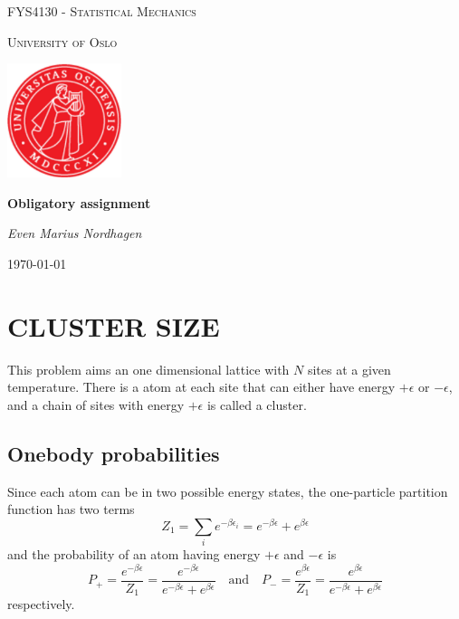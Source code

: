 \documentclass[norsk,a4paper,12pt]{article}
\begin{document}
\begin{titlepage}
	\centering
	{\scshape\huge FYS4130 - Statistical Mechanics \par}
	\vspace{1cm}
	{\scshape\Large University of Oslo\par}
	\vspace{1.5cm}
	\includegraphics[width=0.25\textwidth]{uio.png}\par\vspace{1cm}
	{\Large\bfseries Obligatory assignment\par}
	\vspace{1.5cm}
	{\large\itshape Even Marius Nordhagen\par}
	\vfill
	{\large \today\par}
\end{titlepage}


\section{CLUSTER SIZE}
This problem aims an one dimensional lattice with $N$ sites at a given temperature. There is a atom at each site that can either have energy $+\epsilon$ or $-\epsilon$, and a chain of sites with energy $+\epsilon$ is called a cluster.

\subsection{Onebody probabilities}
Since each atom can be in two possible energy states, the one-particle partition function has two terms
\begin{equation}
Z_1=\sum_ie^{-\beta\epsilon_i}=e^{-\beta\epsilon}+e^{\beta\epsilon}
\end{equation}
and the probability of an atom having energy $+\epsilon$ and $-\epsilon$ is
\begin{equation}
P_+=\frac{e^{-\beta\epsilon}}{Z_1}=\frac{e^{-\beta\epsilon}}{e^{-\beta\epsilon}+e^{\beta\epsilon}}\quad\text{and}\quad P_-=\frac{e^{\beta\epsilon}}{Z_1}=\frac{e^{\beta\epsilon}}{e^{-\beta\epsilon}+e^{\beta\epsilon}}
\end{equation}
respectively.
\end{document}
